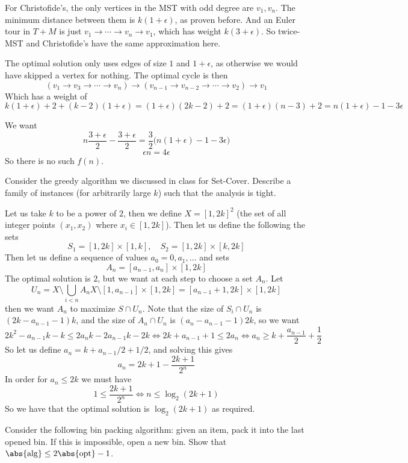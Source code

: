     For Christofide's, the only vertices in the MST with odd degree are $v_1,v_n$.
    The minimum distance between them is $k(1+\epsilon)$, as proven before.
    And an Euler tour in $T+M$ is just $v_1\to\cdots\to v_n\to v_1$, which has weight $k(3+\epsilon)$.
    So twice-MST and Christofide's have the same approximation here.

    The optimal solution only uses edges of size $1$ and $1+\epsilon$, as otherwise we would have skipped a vertex for nothing.
    The optimal cycle is then
    $$ (v_1 \to v_3 \to \cdots \to v_n) \to (v_{n-1} \to v_{n-2} \to \cdots \to v_2) \to v_1 $$
    Which has a weight of
    $$ k(1+\epsilon) + 2 + (k-2)(1+\epsilon) = (1+\epsilon)(2k-2) + 2 = (1+\epsilon)(n-3) + 2 = n(1+\epsilon) - 1 - 3\epsilon $$

    \item We want
    $$ n\frac{3+\epsilon}2 - \frac{3+\epsilon}2 = \frac32\bigl(n(1+\epsilon) - 1 - 3\epsilon\bigr) $$
    $$ \epsilon n = 4\epsilon $$
    So there is no such $f(n)$.
\eenum

\bexerc

    Consider the greedy algorithm we discussed in class for Set-Cover.
    Describe a family of instances (for arbitrarily large $k$) such that the analysis is tight.

\eexerc

Let us take $k$ to be a power of $2$, then we define $X=[1,2k]^2$ (the set of all integer points $(x_1,x_2)$ where $x_i\in[1,2k]$).
Then let us define the following the sets
$$ S_1 = [1,2k] \times [1,k],\quad S_2 = [1,2k] \times [k,2k] $$
Then let us define a sequence of values $a_0=0,a_1,\dots$ and sets
$$ A_n = [a_{n-1},a_n] \times [1,2k] $$
The optimal solution is $2$, but we want at each step to choose a set $A_n$.
Let
$$ U_n=X\setminus\bigcup_{i<n}A_n X \setminus [1,a_{n-1}] \times [1,2k] = [a_{n-1}+1,2k] \times [1,2k] $$
then we want $A_n$ to maximize $S\cap U_n$.
Note that the size of $S_i\cap U_n$ is $(2k-a_{n-1}-1)k$, and the size of $A_n\cap U_n$ is $(a_n-a_{n-1}-1)2k$, so we want
$$ 2k^2 - a_{n-1}k - k \leq 2a_nk - 2a_{n-1}k - 2k \iff 2k + a_{n-1} + 1 \leq 2a_n \iff a_n \geq k + \frac{a_{n-1}}2 + \frac12 $$
So let us define $a_n=k+a_{n-1}/2+1/2$, and solving this gives
$$ a_n = 2k+1 - \frac{2k+1}{2^n} $$
In order for $a_n\leq2k$ we must have
$$ 1 \leq \frac{2k+1}{2^n} \iff n \leq \log_2(2k+1) $$
So we have that the optimal solution is $\log_2(2k+1)$ as required.

\bexerc

    Consider the following bin packing algorithm: given an item, pack it into the last opened bin.
    If this is impossible, open a new bin.
    Show that $\abs{\rm alg}\leq2\abs{\rm opt}-1$.

